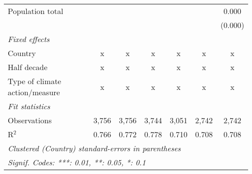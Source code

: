 \begin{tabular}{lcccccc}
   Population total                                            &              &                &                &               &              & 0.000\\   
                                                               &              &                &                &               &              & (0.000)\\   
   \emph{Fixed effects}\\
   Country                                                     & x            & x              & x              & x             & x            & x\\  
   Half decade                                                 & x            & x              & x              & x             & x            & x\\  
   Type of climate action/measure                              & x            & x              & x              & x             & x            & x\\  
   \midrule \emph{Fit statistics}\\
   Observations                                                & 3,756        & 3,756          & 3,744          & 3,051         & 2,742        & 2,742\\  
   R$^2$                                                       & 0.766        & 0.772          & 0.778          & 0.710         & 0.708        & 0.708\\  
   \midrule
   \multicolumn{7}{l}{\emph{Clustered (Country) standard-errors in parentheses}}\\
   \multicolumn{7}{l}{\emph{Signif. Codes: ***: 0.01, **: 0.05, *: 0.1}}\\
\end{tabular}
\par\endgroup


